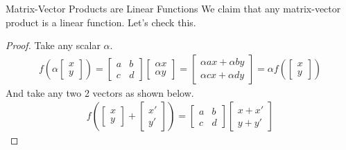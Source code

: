 \documentclass[11pt]{article}
\begin{document}
\begin{theorembox}{Matrix-Vector Products are Linear Functions}
    We claim that any matrix-vector product is a linear function. Let's check this.
\end{theorembox}

\begin{proof}
    Take any scalar $\alpha$.
    \begin{align*}
        f\left(\alpha
        \begin{bmatrix}
            x \\ 
            y
        \end{bmatrix}
        \right)
        =
        \begin{bmatrix}
            a & b \\
            c & d
        \end{bmatrix}
        \begin{bmatrix}
            \alpha x \\
            \alpha y
        \end{bmatrix}
        =
        \begin{bmatrix}
            \alpha a x + \alpha b y \\
            \alpha c x + \alpha d y
        \end{bmatrix}
        =
        \alpha f\left(
        \begin{bmatrix}
            x \\
            y
        \end{bmatrix}
        \right)
    \end{align*}
    And take any two 2 vectors as shown below.
    \begin{align*}
        f\left(
            \begin{bmatrix}
                x \\
                y
            \end{bmatrix}
            +
            \begin{bmatrix}
                x' \\
                y'
            \end{bmatrix}
        \right)
        =
        \begin{bmatrix}
            a & b \\
            c & d
        \end{bmatrix}
        \begin{bmatrix}
            x+x' \\
            y+y'
        \end{bmatrix}

\end{align*}
\end{proof}
\end{document}
